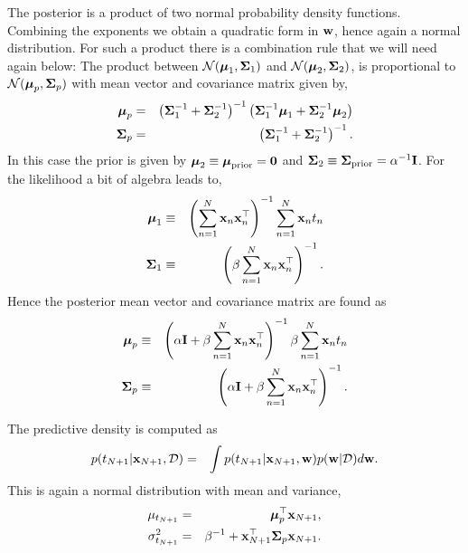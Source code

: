 \documentclass[A4,12pt]{article}    %
\def\xb{{\bf x}}
\def\wb{{\bf w}}
\def\mub{\text{\boldmath $\mu$}}
\def\Sigb{\text{\boldmath $\Sigma$}}
\def\xb{{\bf x}}
\begin{document}
The posterior is a product of two normal probability density functions. Combining the exponents we obtain a quadratic form in $\wb$, hence again a normal distribution.
For such a product there is a combination rule that we will need again below: The product between $\mathcal{N}(\mub_1,\Sigb_1)$ and $\mathcal{N}(\mub_2,\Sigb_2)$, is
proportional to $\mathcal{N}(\mub_p,\Sigb_p)$ with mean vector and covariance matrix given by,
\begin{eqnarray}
 \mub_p &=& \left(\Sigb_1^{-1}+\Sigb_2^{-1}\right)^{-1}\left(\Sigb_1^{-1}\mub_1 + \Sigb_2^{-1}\mub_2 \right) \nonumber \\
 \Sigb_p &=& \left(\Sigb_1^{-1}+\Sigb_2^{-1}\right)^{-1} \label{product rule}.
\end{eqnarray}
In this case the prior is given by $\mub_2 \equiv \mub_{\rm prior} ={\bf 0}$ and $\Sigb_2 \equiv \Sigb_{\rm prior} =\alpha^{-1}{\bf I}$.
For the likelihood a bit of algebra leads to,
\begin{eqnarray}
 \mub_1 &\equiv&  \left(\sum_{n=1}^{N}\xb_n \xb_n^{\top}\right)^{-1}\sum_{n=1}^{N}\xb_n t_n \nonumber \\
 \Sigb_1 &\equiv& \left(\beta \sum_{n=1}^{N}\xb_n \xb_n^{\top}\right)^{-1}.
\end{eqnarray}
Hence the posterior mean vector and covariance matrix are found as
\begin{eqnarray}
 \mub_p &\equiv&  \left(\alpha {\bf I} +  \beta \sum_{n=1}^{N}\xb_n \xb_n^{\top}\right)^{-1}\beta\sum_{n=1}^{N}\xb_n t_n \nonumber \\
 \Sigb_p &\equiv& \left(\alpha {\bf I} + \beta \sum_{n=1}^{N}\xb_n \xb_n^{\top}\right)^{-1}.
\end{eqnarray}

The predictive density is computed as
\begin{eqnarray}
  p(t_{N+1}|\xb_{N+1},\mathcal{D}) &=& \int p(t_{N+1}|\xb_{N+1},\wb) p(\wb|\mathcal{D}) d\wb.
\end{eqnarray}
This is again a normal distribution with mean and variance,
\begin{eqnarray}
 \mu_{t_{N+1}} &=& \mub_p^{\top}\xb_{N+1}, \nonumber \\
 \sigma^2_{t_{N+1}} &= & \beta^{-1} + \xb^{\top}_{N+1} \Sigb_p \xb_{N+1}. \label{predictive mean}
\end{eqnarray}
\end{document}
